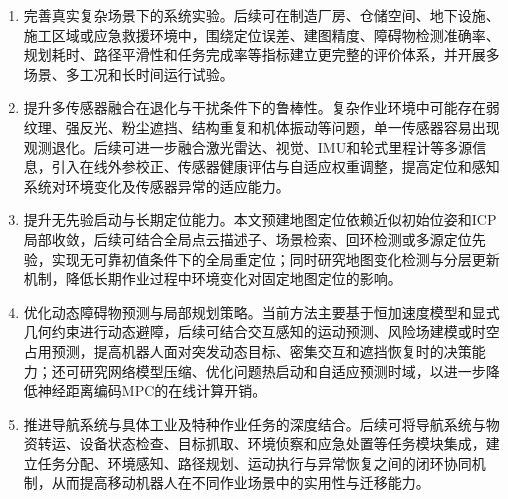 \begin{enumerate}[label=(\arabic*)]
\item 完善真实复杂场景下的系统实验。后续可在制造厂房、仓储空间、地下设施、施工区域或应急救援环境中，围绕定位误差、建图精度、障碍物检测准确率、规划耗时、路径平滑性和任务完成率等指标建立更完整的评价体系，并开展多场景、多工况和长时间运行试验。

\item 提升多传感器融合在退化与干扰条件下的鲁棒性。复杂作业环境中可能存在弱纹理、强反光、粉尘遮挡、结构重复和机体振动等问题，单一传感器容易出现观测退化。后续可进一步融合激光雷达、视觉、IMU和轮式里程计等多源信息，引入在线外参校正、传感器健康评估与自适应权重调整，提高定位和感知系统对环境变化及传感器异常的适应能力。

\item 提升无先验启动与长期定位能力。本文预建地图定位依赖近似初始位姿和ICP局部收敛，后续可结合全局点云描述子、场景检索、回环检测或多源定位先验，实现无可靠初值条件下的全局重定位；同时研究地图变化检测与分层更新机制，降低长期作业过程中环境变化对固定地图定位的影响。

\item 优化动态障碍物预测与局部规划策略。当前方法主要基于恒加速度模型和显式几何约束进行动态避障，后续可结合交互感知的运动预测、风险场建模或时空占用预测，提高机器人面对突发动态目标、密集交互和遮挡恢复时的决策能力；还可研究网络模型压缩、优化问题热启动和自适应预测时域，以进一步降低神经距离编码MPC的在线计算开销。

\item 推进导航系统与具体工业及特种作业任务的深度结合。后续可将导航系统与物资转运、设备状态检查、目标抓取、环境侦察和应急处置等任务模块集成，建立任务分配、环境感知、路径规划、运动执行与异常恢复之间的闭环协同机制，从而提高移动机器人在不同作业场景中的实用性与迁移能力。
\end{enumerate}

